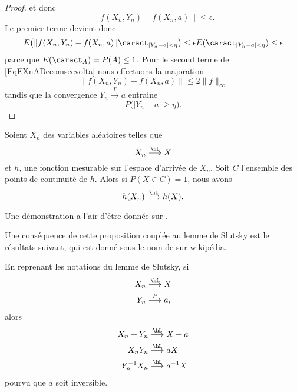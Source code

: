 \begin{proof}
    et donc
    \begin{equation}
        \| f(X_n,Y_n)-f(X_n,a) \|\leq \epsilon.
    \end{equation}
    Le premier terme devient donc
    \begin{equation}
        E\big( \| f(X_n,Y_n)-f(X_n,a) \|\caract_{| Y_n-a |<\eta} \big)\leq \epsilon E(\caract_{| Y_n-a |<\eta})\leq \epsilon
    \end{equation}
    parce que \( E(\caract_A)=P(A)\leq 1\). Pour le second terme de \eqref{EqEXnADecomsecvolta} nous effectuons la majoration
    \begin{equation}
        \| f(X_n,Y_n)-f(X_n,a) \|\leq 2\| f \|_{\infty}
    \end{equation}
    tandis que la convergence \( Y_n\stackrel{P}{\longrightarrow} a\) entraine 
    \begin{equation}
        P\big( | Y_n-a |\geq \eta \big).
    \end{equation}
\end{proof}

\begin{proposition}     \label{PropcvLsousfonc}
    Soient \( X_n\) des variables aléatoires telles que
    \begin{equation}
        X_n\stackrel{\hL}{\longrightarrow} X
    \end{equation}
    et \( h\), une fonction mesurable sur l'espace d'arrivée de \( X_n\). Soit \( C\) l'ensemble des points de continuité de \( h\). Alors si \( P(X\in C)=1\), nous avons 
    \begin{equation}
        h(X_n)\stackrel{\hL}{\longrightarrow}h(X).
    \end{equation}
\end{proposition}
Une démonstration a l'air d'être donnée sur .

Une conséquence de cette proposition couplée au lemme de Slutsky est le résultats suivant, qui est donné sous le nom de  sur wikipédia.
\begin{corollary}       \label{CorINgTPH}
    En reprenant les notations du lemme de Slutsky, si
    \begin{subequations}
        \begin{align}
            X_n&\stackrel{\hL}{\longrightarrow} X\\
            Y_n&\stackrel{P}{\longrightarrow} a,
        \end{align}
    \end{subequations}
    alors
    \begin{subequations}
        \begin{align}
            X_n+Y_n&\stackrel{\hL}{\longrightarrow}X+a\\
            X_nY_n&\stackrel{\hL}{\longrightarrow}aX\\
            Y_n^{-1}X_n&\stackrel{\hL}{\longrightarrow}a^{-1}X\\
        \end{align}
    \end{subequations}
    pourvu que \( a\) soit inversible.
\end{corollary}


